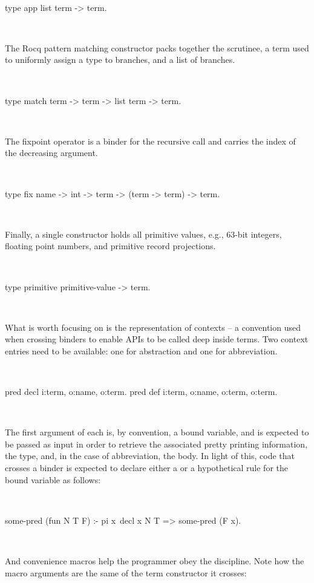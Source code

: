 \documentclass[a4paper, 11pt]{book}
\newenvironment{elpicode}
  {\VerbatimEnvironment~\\\begin{elpibox}\begin{xelpicode}}{\end{xelpicode}
\end{elpibox}\\}
\begin{document}
\begin{elpicode}
type app       list term -> term.                     
\end{elpicode}

\noindent
The Rocq pattern matching constructor packs together the scrutinee, a term
used to uniformly assign a type to branches, and a list of branches.

\begin{elpicode}
type match     term -> term -> list term -> term.   
\end{elpicode}

\noindent
The
fixpoint operator is a binder for the recursive call and carries the index of
the decreasing argument. 

\begin{elpicode}
type fix       name -> int -> term -> (term -> term) -> term.
\end{elpicode}

\noindent
Finally, a single constructor holds all primitive
values, e.g., 63-bit integers, floating point numbers, and primitive record
projections.

\begin{elpicode}
type primitive primitive-value -> term.
\end{elpicode}

What is worth focusing on is the representation of contexts -- a convention used
when crossing binders to enable APIs to be called deep inside terms. Two
context entries need to be available: one for abstraction and one for
abbreviation.

\begin{elpicode}
pred decl i:term, o:name, o:term.                 %
pred def  i:term, o:name, o:term, o:term.         %
\end{elpicode}

The first argument of each is, by convention, a bound variable, and is
expected to be passed as input in order to retrieve the associated pretty
printing information, the type, and, in the case of abbreviation, the body. In
light of this, code that crosses a binder is expected to declare either a
 or a  hypothetical rule for the bound variable as
follows:

\begin{elpicode}
some-pred (fun N T F) :- pi x\ decl x N T => some-pred (F x).
\end{elpicode}

\noindent
And convenience macros help the programmer obey the discipline. Note how
the macro arguments are the same of the term constructor it crosses:
\end{document}
